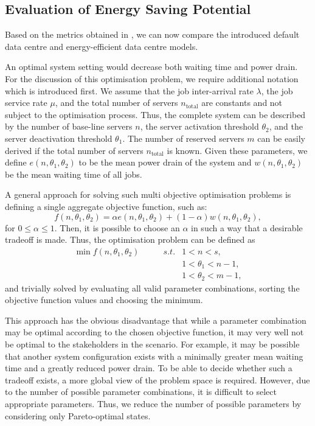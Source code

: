 \subsection{Evaluation of Energy Saving Potential}\label{sec:cloud:data_centers:performance_evaluation}
Based on the metrics obtained in , we can now compare the introduced default data centre and energy-efficient data centre models.

An optimal system setting would decrease both waiting time and power drain.
For the discussion of this optimisation problem, we require additional notation which is introduced first.
We assume that the job inter-arrival rate \(\lambda\), the job service rate \(\mu\), and the total number of servers \(n_\text{total}\) are constants and not subject to the optimisation process.
Thus, the complete system can be described by the number of base-line servers \(n\), the server activation threshold \(\theta_2\), and the server deactivation threshold \(\theta_1\).
The number of reserved servers \(m\) can be easily derived if the total number of servers \(n_\text{total}\) is known.
Given these parameters, we define \(e(n, \theta_1, \theta_2)\) to be the mean power drain of the system and \(w(n, \theta_1, \theta_2)\) be the mean waiting time of all jobs.

A general approach for solving such multi objective optimisation problems is defining a single aggregate objective function, such as:
\begin{equation}
f(n, \theta_1, \theta_2) = \alpha e(n, \theta_1, \theta_2)  + (1-\alpha) w(n, \theta_1, \theta_2),
\end{equation}
for \(0\leq\alpha\leq 1\).
Then, it is possible to choose an \(\alpha\) in such a way that a desirable tradeoff is made. Thus, the optimisation problem can be defined as
\begin{align}
\min f(n, \theta_1, \theta_2) \qquad&s.t.& 1 < n < s,\\
&&1 < \theta_1 < n - 1,\nonumber\\
&&1 < \theta_2 < m - 1\nonumber,
\end{align}
and trivially solved by evaluating all valid parameter combinations, sorting the objective function values and choosing the minimum.

This approach has the obvious disadvantage that while a parameter combination may be optimal according to the chosen objective function, it may very well not be optimal to the stakeholders in the scenario.
For example, it may be possible that another system configuration exists with a minimally greater mean waiting time and a greatly reduced power drain.
To be able to decide whether such a tradeoff exists, a more global view of the problem space is required.
However, due to the number of possible parameter combinations, it is difficult to select appropriate parameters.
Thus, we reduce the number of possible parameters by considering only Pareto-optimal states.

